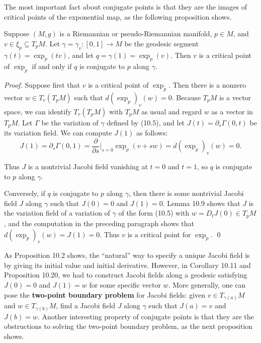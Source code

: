 The most important fact about conjugate points is that they are the images of critical points of the exponential map, as the following proposition shows.

\begin{proposition}
\label{prop:critical-points-conjugate}

Suppose $(M, g)$ is a Riemannian or pseudo-Riemannian manifold, $p \in M$, and $v \in \xi_p \subseteq T_p M$. Let $\gamma = \gamma_v: [0, 1] \to M$ be the geodesic segment $\gamma(t) = \exp_p(tv)$, and let $q = \gamma(1) = \exp_p(v)$. Then $v$ is a critical point of $\exp_p$ if and only if $q$ is conjugate to $p$ along $\gamma$.

\begin{proof}
Suppose first that $v$ is a critical point of $\exp_p$. Then there is a nonzero vector $w \in T_v(T_p M)$ such that $d(\exp_p)_v(w) = 0$. Because $T_p M$ is a vector space, we can identify $T_v(T_p M)$ with $T_p M$ as usual and regard $w$ as a vector in $T_p M$. Let $\Gamma$ be the variation of $\gamma$ defined by (10.5), and let $J(t) = \partial_s \Gamma(0,t)$ be its variation field. We can compute $J(1)$ as follows:
$$J(1) = \partial_s \Gamma(0,1) = \frac{\partial}{\partial s}\bigg|_{s=0} \exp_p(v + sw) = d(\exp_p)_v(w) = 0.$$

Thus $J$ is a nontrivial Jacobi field vanishing at $t = 0$ and $t = 1$, so $q$ is conjugate to $p$ along $\gamma$.

Conversely, if $q$ is conjugate to $p$ along $\gamma$, then there is some nontrivial Jacobi field $J$ along $\gamma$ such that $J(0) = 0$ and $J(1) = 0$. Lemma 10.9 shows that $J$ is the variation field of a variation of $\gamma$ of the form (10.5) with $w = D_t J(0) \in T_p M$, and the computation in the preceding paragraph shows that $d(\exp_p)_v(w) = J(1) = 0$. Thus $v$ is a critical point for $\exp_p$. \qed
\end{proof}
\end{proposition}

As Proposition 10.2 shows, the ``natural'' way to specify a unique Jacobi field is by giving its initial value and initial derivative. However, in Corollary 10.11 and Proposition 10.20, we had to construct Jacobi fields along a geodesic satisfying $J(0) = 0$ and $J(1) = w$ for some specific vector $w$. More generally, one can pose the \textbf{two-point boundary problem} for Jacobi fields: given $v \in T_{\gamma(a)} M$ and $w \in T_{\gamma(b)} M$, find a Jacobi field $J$ along $\gamma$ such that $J(a) = v$ and $J(b) = w$. Another interesting property of conjugate points is that they are the obstructions to solving the two-point boundary problem, as the next proposition shows.


